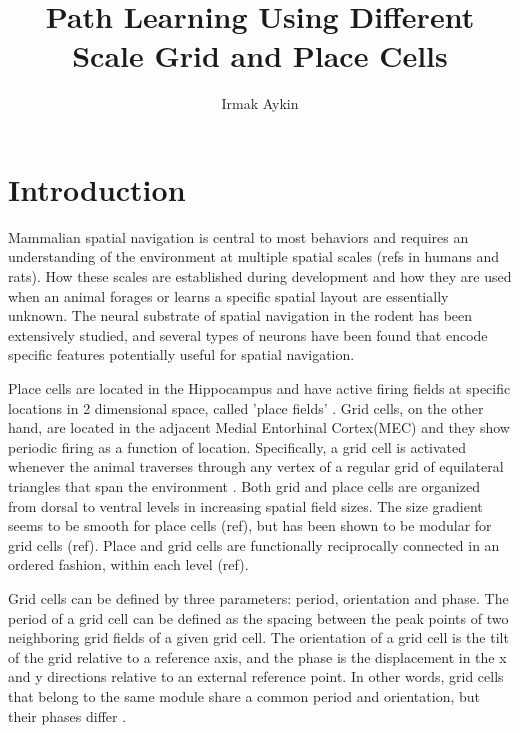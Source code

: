\documentclass[11pt, letterpaper, onecolumn]{article}
\begin{document}
\renewcommand{\refname}{\vspace{-0.25in}}
\setcounter{task}{1}
\newcommand{\task}{Task \#\arabic{task}\addtocounter{task}{1}}


\title{Path Learning Using Different Scale Grid and Place Cells}
\author{Irmak Aykin}
\maketitle

\newpage
\setcounter{page}{1}
\section{Introduction}

Mammalian spatial navigation is central to most behaviors and requires an understanding of the environment at multiple spatial scales (refs in humans and rats). How these scales are established during development and how they are used when an animal forages or learns a specific spatial layout are essentially unknown.
The neural substrate of spatial navigation in the rodent has been extensively studied, and several types of neurons have been found that encode specific features potentially useful for spatial navigation.

Place cells are located in the Hippocampus and have active firing fields at specific locations in 2 dimensional space, called 'place fields' \cite{Keefe:hippocampus78}. Grid cells, on the other hand, are located in the adjacent Medial Entorhinal Cortex(MEC) and they show periodic firing as a function of location. Specifically, a grid cell is activated whenever the animal traverses through any vertex of a regular grid of equilateral triangles that span the environment \cite{Hafting:Microstructure05}. Both grid and place cells are organized from dorsal to ventral levels in increasing spatial field sizes. The size gradient seems to be smooth for place cells (ref), but has been shown to be modular for grid cells (ref). Place and grid cells are functionally reciprocally connected in an ordered fashion, within each level (ref).

Grid cells can be defined by three parameters: period, orientation and phase. The period of a grid cell can be defined as the spacing between the peak points of two neighboring grid fields of a given grid cell. The orientation of a grid cell is the tilt of the grid relative to a reference axis, and the phase is the displacement in the x and y directions relative to an external reference point. In other words, grid cells that belong to the same module share a common period and orientation, but their phases differ \cite{Hafting:Microstructure05}.
\end{document}
